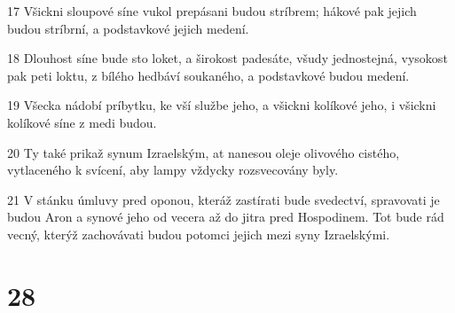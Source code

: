 \par 17 Všickni sloupové síne vukol prepásani budou stríbrem; hákové pak jejich budou stríbrní, a podstavkové jejich medení.
\par 18 Dlouhost síne bude sto loket, a širokost padesáte, všudy jednostejná, vysokost pak peti loktu, z bílého hedbáví soukaného, a podstavkové budou medení.
\par 19 Všecka nádobí príbytku, ke vší službe jeho, a všickni kolíkové jeho, i všickni kolíkové síne z medi budou.
\par 20 Ty také prikaž synum Izraelským, at nanesou oleje olivového cistého, vytlaceného k svícení, aby lampy vždycky rozsvecovány byly.
\par 21 V stánku úmluvy pred oponou, kteráž zastírati bude svedectví, spravovati je budou Aron a synové jeho od vecera až do jitra pred Hospodinem. Tot bude rád vecný, kterýž zachovávati budou potomci jejich mezi syny Izraelskými.

\chapter{28}

